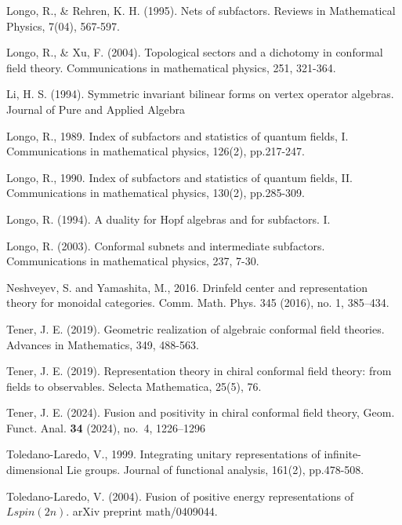 \documentclass[11pt,b5paper,notitlepage]{article}
\theoremstyle{definition}
\theoremstyle{plain}
\numberwithin{equation}{section}
\begin{document}
\begin{thebibliography}{999999}
Longo, R., \& Rehren, K. H. (1995). Nets of subfactors. Reviews in Mathematical Physics, 7(04), 567-597.

Longo, R., \& Xu, F. (2004). Topological sectors and a dichotomy in conformal field theory. Communications in mathematical physics, 251, 321-364.

Li, H. S. (1994). Symmetric invariant bilinear forms on vertex operator algebras. Journal of Pure and Applied Algebra


Longo, R., 1989. Index of subfactors and statistics of quantum fields, I. Communications in mathematical physics, 126(2), pp.217-247.

Longo, R., 1990. Index of subfactors and statistics of quantum fields, II. Communications in mathematical physics, 130(2), pp.285-309.

Longo, R. (1994). A duality for Hopf algebras and for subfactors. I.

Longo, R. (2003). Conformal subnets and intermediate subfactors. Communications in mathematical physics, 237, 7-30.

Neshveyev, S. and Yamashita, M., 2016. Drinfeld center and representation theory for monoidal categories. Comm. Math. Phys. 345 (2016), no. 1, 385–434.


Tener, J. E. (2019). Geometric realization of algebraic conformal field theories. Advances in Mathematics, 349, 488-563.

Tener, J. E. (2019). Representation theory in chiral conformal field theory: from fields to observables. Selecta Mathematica, 25(5), 76.




Tener, J. E. (2024). Fusion and positivity in chiral conformal field theory, Geom. Funct. Anal. {\bf 34} (2024), no.~4, 1226--1296

Toledano-Laredo, V., 1999. Integrating unitary representations of infinite-dimensional Lie groups. Journal of functional analysis, 161(2), pp.478-508.

Toledano-Laredo, V. (2004). Fusion of positive energy representations of $Lspin(2n)$. arXiv preprint math/0409044.


\end{thebibliography}
\end{document}
